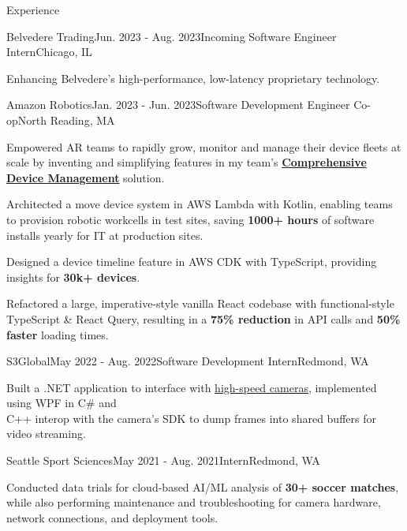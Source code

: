 \documentclass{resume}
\begin{document}
  \begin{rSection}{Experience}

    \begin{rSubsection}{Belvedere Trading}{Jun. 2023 - Aug. 2023}{Incoming Software Engineer Intern}{Chicago, IL}
      \item Enhancing Belvedere’s high-performance, low-latency proprietary technology.
    \end{rSubsection}

    \begin{rSubsection}{Amazon Robotics}{Jan. 2023 - Jun. 2023}{Software Development Engineer Co-op}{North Reading, MA}
      \item Empowered AR teams to rapidly grow, monitor and manage their device fleets at scale by inventing and simplifying
        features in my team's 
        \textbf{\href{https://www.allthingsdistributed.com/2021/07/amazon-robotics-on-aws.html}{Comprehensive Device Management}} solution. 
      \item Architected a move device system in AWS Lambda with Kotlin, enabling teams to provision robotic workcells in test 
        sites, saving \textbf{1000+ hours} of software installs yearly for IT at production sites.
      \item Designed a device timeline feature in AWS CDK with TypeScript, providing insights for \textbf{30k+ devices}. 
      \item Refactored a large, imperative-style vanilla React codebase with functional-style 
        TypeScript \& React Query, resulting in a \textbf{75\% reduction} in API calls and \textbf{50\% faster} loading times.
    \end{rSubsection}

    \begin{rSubsection}{S3Global}{May 2022 - Aug. 2022}{Software Development Intern}{Redmond, WA}
      \item Built a .NET application to interface with \href{https://emergentvisiontec.com/}{high-speed cameras}, implemented
        using WPF in C\# and \\ C++ interop with the camera's SDK to dump frames into shared buffers for video streaming.
    \end{rSubsection}

    \begin{rSubsection}{Seattle Sport Sciences}{May 2021 - Aug. 2021}{Intern}{Redmond, WA}
      \item Conducted data trials for cloud-based AI/ML analysis of \textbf{30+ soccer matches}, while
        also performing maintenance and troubleshooting for camera hardware, network connections, and deployment tools.
    \end{rSubsection}

  \end{rSection}
  
\end{document}
